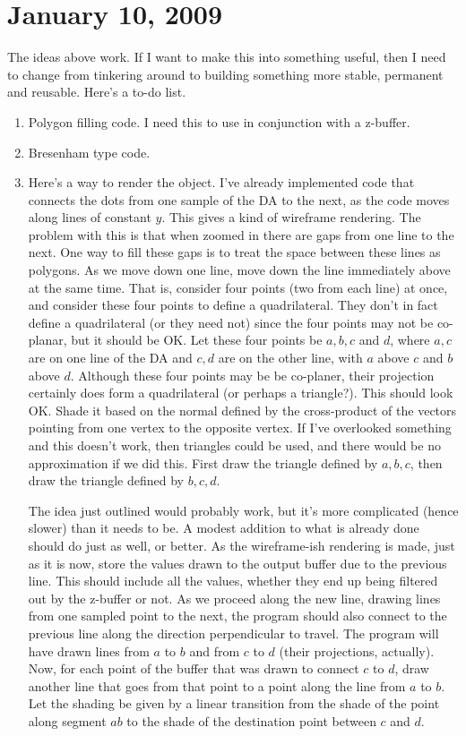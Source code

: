 \documentclass[titlepage,oneside,10pt]{article}
\begin{document}
\section{January 10, 2009}

The ideas above work. If I want to make this into something useful,
then I need to change from tinkering around to building something more
stable, permanent and reusable. Here's a to-do list.
\begin{enumerate}
\item Polygon filling code. I need this to use in conjunction
  with a z-buffer.
\item Bresenham type code. 
\item Here's a way to render the object. I've already implemented code
  that connects the dots from one sample of the DA to the next, as the
  code moves along lines of constant $y$. This gives a kind of
  wireframe rendering. The problem with this is that when zoomed in
  there are gaps from one line to the next. One way to fill these gaps
  is to treat the space between these lines as polygons. As we move
  down one line, move down the line immediately above at the same
  time. That is, consider four points (two from each line) at once,
  and consider these four points to define a quadrilateral. They don't
  in fact define a quadrilateral (or they need not) since the four
  points may not be co-planar, but it should be OK. Let these four
  points be $a,b,c$ and $d$, where $a,c$ are on one line of the DA and
  $c,d$ are on the other line, with $a$ above $c$ and $b$ above
  $d$. Although these four points may be be co-planer, their
  projection certainly does form a quadrilateral (or perhaps a
  triangle?). This should look OK. Shade it based on the normal
  defined by the cross-product of the vectors pointing from one vertex
  to the opposite vertex. If I've overlooked something and this
  doesn't work, then triangles could be used, and there would be no
  approximation if we did this. First draw the triangle defined by
  $a,b,c$, then draw the triangle defined by $b,c,d$. 

The idea just outlined would probably work, but it's more complicated
(hence slower) than it needs to be. A modest addition to what is
already done should do just as well, or better. As the wireframe-ish
rendering is made, just as it is now, store the values drawn to the
output buffer due to the previous line. This should include all the
values, whether they end up being filtered out by the z-buffer or
not. As we proceed along the new line, drawing lines from one sampled
point to the next, the program should also connect to the previous
line along the direction perpendicular to travel. The program will
have drawn lines from $a$ to $b$ and from $c$ to $d$ (their
projections, actually). Now, for each point of the buffer that was
drawn to connect $c$ to $d$, draw another line that goes from that
point to a point along the line from $a$ to $b$. Let the shading be
given by a linear transition from the shade of the point along segment
$ab$ to the shade of the destination point between $c$ and $d$.
\end{enumerate}
\end{document}
